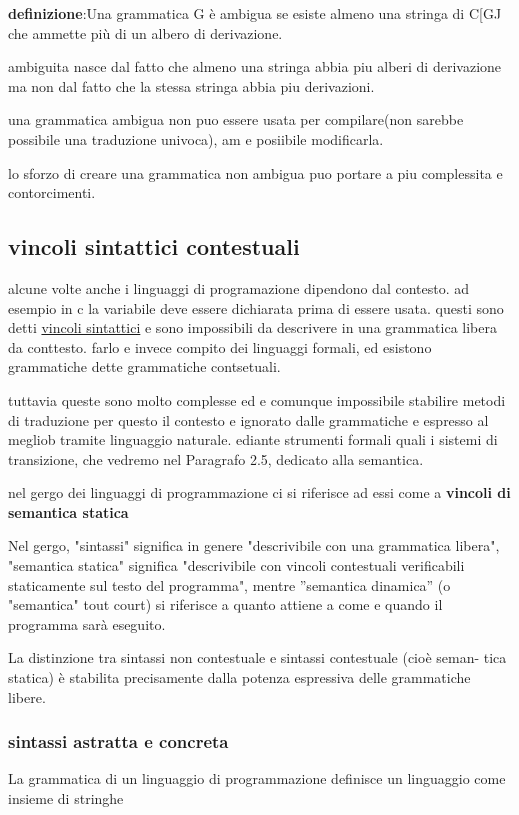 \documentclass[12pt]{article}
\begin{document}
\textbf{definizione}:Una grammatica G è ambigua se esiste almeno
una stringa di C[GJ che ammette più di un albero di derivazione.

ambiguita nasce dal fatto che almeno una stringa abbia piu alberi di derivazione ma non dal fatto che la stessa stringa abbia piu derivazioni.

una grammatica ambigua non puo essere usata per compilare(non sarebbe possibile una traduzione univoca), am e posiibile modificarla.

lo sforzo di creare una grammatica non ambigua puo portare a piu complessita e contorcimenti.

\subsection{vincoli sintattici contestuali}
alcune volte anche i linguaggi di programazione dipendono dal contesto.
ad esempio in c la variabile deve essere dichiarata prima di essere usata.
questi sono detti \underline{vincoli sintattici} 
e sono impossibili da descrivere in una grammatica libera da conttesto.
farlo e invece compito dei linguaggi formali, ed esistono grammatiche dette grammatiche contsetuali.

tuttavia queste sono molto complesse ed e comunque impossibile stabilire metodi di traduzione per questo il contesto e ignorato dalle grammatiche e espresso al megliob tramite linguaggio naturale.
ediante strumenti formali quali i sistemi di transizione, che vedremo nel
Paragrafo 2.5, dedicato alla semantica.

nel gergo dei linguaggi di programmazione ci si
riferisce ad essi come a \textbf{vincoli di semantica statica}

Nel gergo, "sintassi" significa in genere "descrivibile con una grammatica libera", "semantica statica" significa "descrivibile con vincoli contestuali verificabili staticamente sul testo del
programma", mentre ''semantica dinamica'' (o "semantica" tout court) si riferisce
a quanto attiene a come e quando il programma sarà eseguito.

La distinzione tra sintassi non contestuale e sintassi contestuale (cioè seman-
tica statica) è stabilita precisamente dalla potenza espressiva delle grammatiche
libere.

\subsubsection{sintassi astratta e concreta}
La grammatica di un linguaggio di programmazione definisce un linguaggio come
insieme di stringhe
\end{document}
